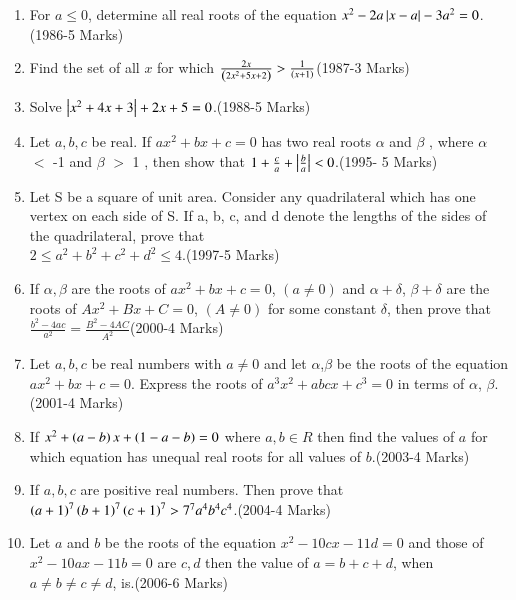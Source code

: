 \documentclass[journal]{IEEEtran}
\begin{document}
\begin{enumerate}[start=13]
 \item For $a \leq 0$, determine all real roots of the equation $x^2-2a\left\vert x-a\right\vert-3a^2=0$.\hfill{(1986-5 Marks)}
 \item Find the set of all $x$ for which $\frac{2x}{\left(2x^2+5x+2\right)}>\frac{1}{\left(x+1\right)}$\hfill{(1987-3 Marks)}
 \item Solve $\left\vert x^2+4x+3\right\vert+2x+5=0$.\hfill{(1988-5 Marks)}
 \item Let $a,b,c$ be real. If $ax^2+bx+c=0$ has two real roots $\alpha$ and $\beta$ , where $\alpha$ $<$ -1 and $\beta$ $>$ 1 , then show that $1+\frac{c}{a}+\left\vert\frac{b}{a}\right\vert<0$.\hfill{(1995- 5 Marks)}
 \item Let S be a square of unit area. Consider any quadrilateral which has one vertex on each side of S. If a, b, c, and d denote the lengths of the sides of the quadrilateral, prove that \\$2 \leq a^2+b^2+c^2+d^2 \leq 4$.\hfill{(1997-5 Marks)}
 \item If $\alpha,\beta$ are the roots of $ax^2+bx+c=0$, $(a\neq 0)$ and $\alpha+\delta$, $\beta+\delta$ are the roots of $Ax^2+Bx+C=0$, $(A\neq 0)$ for some constant $\delta$, then prove that $\frac{b^2-4ac}{a^2}=\frac{B^2-4AC}{A^2}$\hfill{(2000-4 Marks)}
 \item Let $a, b,c $ be real numbers with $a\neq0$ and let $\alpha$,$\beta$ be the roots of the equation $ax^2+bx+c=0$. Express the roots of $a^3x^2+abcx+c^3=0$ in terms of $\alpha$, $\beta$.\hfill{(2001-4 Marks)}
\item If $x^2+\left(a-b\right)x+\left(1-a-b\right)=0$ where $a, b\in R$ then find the values of $a$ for which equation has unequal real roots for all values of $b$.\hfill{(2003-4 Marks)}
\item If $a, b, c$ are positive real numbers. Then prove that $\left(a+1\right)^7\left(b+1\right)^7\left(c+1\right)^7 > 7^7a^4b^4c^4$.\hfill{(2004-4 Marks)}
\item Let $a$ and $b$ be the roots of the equation $x^2-10cx-11d=0$ and those of $x^2-10ax-11b=0$ are $c,d $ then the value of $a=b+c+d$, when $a\neq b\neq c\neq d$, is.\hfill{(2006-6 Marks)}


\end{enumerate}
\bigskip
\end{document}
